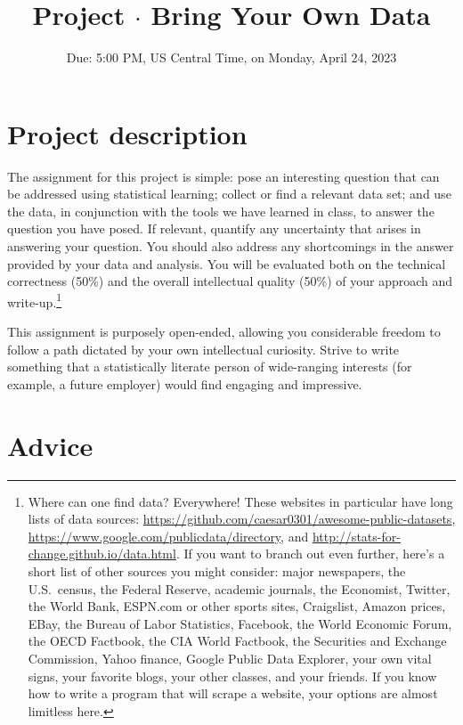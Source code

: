 \documentclass{mynotes}
\title[Project $\cdot$ ECO 395M]{Project $\cdot$ Bring Your Own Data}
\date{Due: 5:00 PM, US Central Time, on Monday, April 24, 2023}  %
\begin{document}
\maketitle%


\section{Project description}

The assignment for this project is simple: pose an interesting question that can be addressed using statistical learning; collect or find a relevant data set; and use the data, in conjunction with the tools we have learned in class, to answer the question you have posed.  If relevant, quantify any uncertainty that arises in answering your question.  You should also address any shortcomings in the answer provided by your data and analysis.   You will be evaluated both on the technical correctness (50\%) and the overall intellectual quality (50\%) of your approach and write-up.\footnote{Where can one find data?  Everywhere!  These websites in particular have long lists of data sources: \url{https://github.com/caesar0301/awesome-public-datasets}, \url{https://www.google.com/publicdata/directory}, and  \url{http://stats-for-change.github.io/data.html}.   If you want to branch out even further, here's a short list of other sources you might consider: major newspapers, the U.S.~census, the Federal Reserve, academic journals, the Economist, Twitter, the World Bank, ESPN.com or other sports sites, Craigslist, Amazon prices, EBay, the Bureau of Labor Statistics, Facebook, the World Economic Forum, the OECD Factbook, the CIA World Factbook, the Securities and Exchange Commission, Yahoo finance, Google Public Data Explorer,  your own vital signs, your favorite blogs, your other classes, and your friends.  If you know how to write a program that will scrape a website, your options are almost limitless here. }

This assignment is purposely open-ended, allowing you considerable freedom to follow a path dictated by your own intellectual curiosity.  Strive to write something that a statistically literate person of wide-ranging interests (for example, a future employer) would find engaging and impressive.

\section{Advice}
\end{document}

